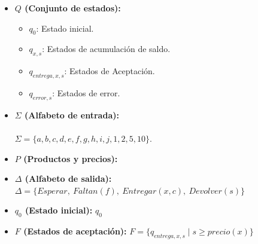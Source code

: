 \documentclass{article}
\begin{document}
\begin{itemize}
    \item \textbf{$Q$ (Conjunto de estados):} 
    \begin{itemize}
        \item $q_0$: Estado inicial.
        \item $q_{x, s}$: Estados de acumulación de saldo.
        \item $q_{entrega, x, s}$: Estados de Aceptación.
        \item $q_{error, s}$: Estados de error.
    \end{itemize}
    
    \item \textbf{$\Sigma$ (Alfabeto de entrada):} \\
    \\ $\Sigma = \{a, b, c, d, e, f, g, h, i, j, 1, 2, 5, 10\}$.

    \item \textbf{$P$ (Productos y precios):}
    \begin{center}
    \end{center}

    \item \textbf{$\Delta$ (Alfabeto de salida):} $\Delta = \{Esperar,\ Faltan(f),\ Entregar(x, c),\ Devolver(s)\}$
    
    \item \textbf{$q_0$ (Estado inicial):} $q_0$
    
    \item \textbf{$F$ (Estados de aceptación):} $F = \{ q_{entrega, x, s} \mid s \ge precio(x) \}$ 
    

\end{itemize}
\end{document}
